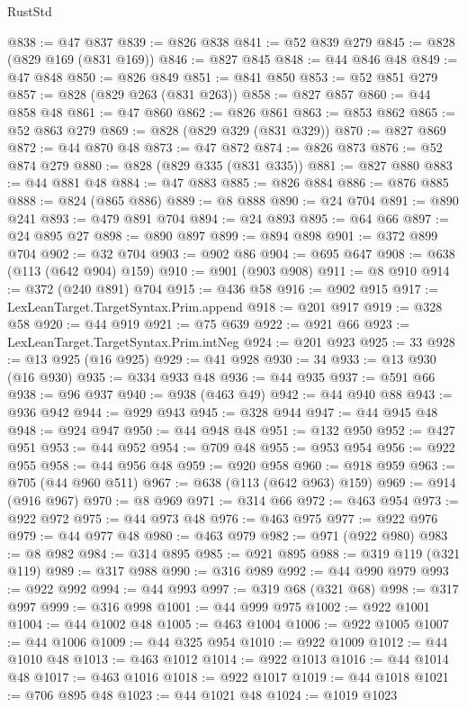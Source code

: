 \begin{lexlean}{RustStd}
\begin{coremodule}
@838 := @47 @837
@839 := @826 @838
@841 := @52 @839 @279
@845 := @828 (@829 @169 (@831 @169))
@846 := @827 @845
@848 := @44 @846 @48
@849 := @47 @848
@850 := @826 @849
@851 := @841 @850
@853 := @52 @851 @279
@857 := @828 (@829 @263 (@831 @263))
@858 := @827 @857
@860 := @44 @858 @48
@861 := @47 @860
@862 := @826 @861
@863 := @853 @862
@865 := @52 @863 @279
@869 := @828 (@829 @329 (@831 @329))
@870 := @827 @869
@872 := @44 @870 @48
@873 := @47 @872
@874 := @826 @873
@876 := @52 @874 @279
@880 := @828 (@829 @335 (@831 @335))
@881 := @827 @880
@883 := @44 @881 @48
@884 := @47 @883
@885 := @826 @884
@886 := @876 @885
@888 := @824 (@865 @886)
@889 := @8 @888
@890 := @24 @704
@891 := @890 @241
@893 := @479 @891 @704
@894 := @24 @893
@895 := @64 @66
@897 := @24 @895 @27
@898 := @890 @897
@899 := @894 @898
@901 := @372 @899 @704
@902 := @32 @704
@903 := @902 @86
@904 := @695 @647
@908 := @638 (@113 (@642 @904) @159)
@910 := @901 (@903 @908)
@911 := @8 @910
@914 := @372 (@240 @891) @704
@915 := @436 @58
@916 := @902 @915
@917 := LexLeanTarget.TargetSyntax.Prim.append
@918 := @201 @917
@919 := @328 @58
@920 := @44 @919
@921 := @75 @639
@922 := @921 @66
@923 := LexLeanTarget.TargetSyntax.Prim.intNeg
@924 := @201 @923
@925 := 33
@928 := @13 @925 (@16 @925)
@929 := @41 @928
@930 := 34
@933 := @13 @930 (@16 @930)
@935 := @334 @933 @48
@936 := @44 @935
@937 := @591 @66
@938 := @96 @937
@940 := @938 (@463 @49)
@942 := @44 @940 @88
@943 := @936 @942
@944 := @929 @943
@945 := @328 @944
@947 := @44 @945 @48
@948 := @924 @947
@950 := @44 @948 @48
@951 := @132 @950
@952 := @427 @951
@953 := @44 @952
@954 := @709 @48
@955 := @953 @954
@956 := @922 @955
@958 := @44 @956 @48
@959 := @920 @958
@960 := @918 @959
@963 := @705 (@44 @960 @511)
@967 := @638 (@113 (@642 @963) @159)
@969 := @914 (@916 @967)
@970 := @8 @969
@971 := @314 @66
@972 := @463 @954
@973 := @922 @972
@975 := @44 @973 @48
@976 := @463 @975
@977 := @922 @976
@979 := @44 @977 @48
@980 := @463 @979
@982 := @971 (@922 @980)
@983 := @8 @982
@984 := @314 @895
@985 := @921 @895
@988 := @319 @119 (@321 @119)
@989 := @317 @988
@990 := @316 @989
@992 := @44 @990 @979
@993 := @922 @992
@994 := @44 @993
@997 := @319 @68 (@321 @68)
@998 := @317 @997
@999 := @316 @998
@1001 := @44 @999 @975
@1002 := @922 @1001
@1004 := @44 @1002 @48
@1005 := @463 @1004
@1006 := @922 @1005
@1007 := @44 @1006
@1009 := @44 @325 @954
@1010 := @922 @1009
@1012 := @44 @1010 @48
@1013 := @463 @1012
@1014 := @922 @1013
@1016 := @44 @1014 @48
@1017 := @463 @1016
@1018 := @922 @1017
@1019 := @44 @1018
@1021 := @706 @895 @48
@1023 := @44 @1021 @48
@1024 := @1019 @1023

\end{coremodule}
\end{lexlean}
